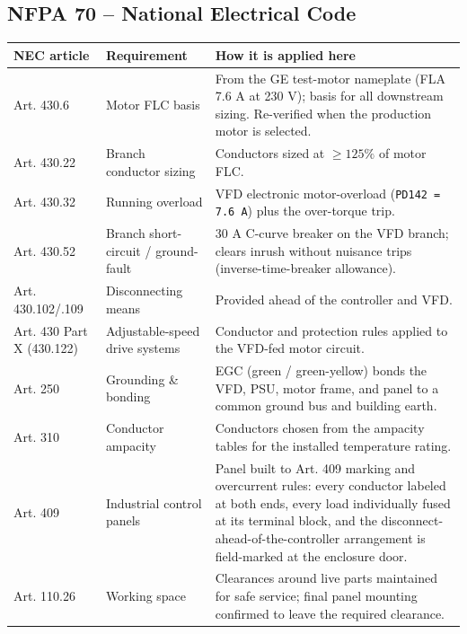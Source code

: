 \documentclass[hidelinks,12pt]{article}
\begin{document}
\subsection{NFPA 70 -- National Electrical Code}
\label{subsec:nec}
\renewcommand{\arraystretch}{1.3}
\noindent\begin{tabularx}{\textwidth}{|p{2.5cm}|p{3.0cm}|X|}
\hline
\rowcolor{PSUgreen!12}\textbf{NEC article} & \textbf{Requirement} & \textbf{How it is applied here} \\
\hline
Art. 430.6 & Motor FLC basis & From the GE test-motor nameplate (FLA 7.6 A at 230 V); basis for all downstream sizing. Re-verified when the production motor is selected. \\ \hline
Art. 430.22 & Branch conductor sizing & Conductors sized at $\geq 125\%$ of motor FLC. \\ \hline
Art. 430.32 & Running overload & VFD electronic motor-overload (\texttt{PD142 = 7.6 A}) plus the over-torque trip. \\ \hline
Art. 430.52 & Branch short-circuit / ground-fault & 30 A C-curve breaker on the VFD branch; clears inrush without nuisance trips (inverse-time-breaker allowance). \\ \hline
Art. 430.102/.109 & Disconnecting means & Provided ahead of the controller and VFD. \\ \hline
Art. 430 Part X (430.122) & Adjustable-speed drive systems & Conductor and protection rules applied to the VFD-fed motor circuit. \\ \hline
Art. 250 & Grounding \& bonding & EGC (green / green-yellow) bonds the VFD, PSU, motor frame, and panel to a common ground bus and building earth. \\ \hline
Art. 310 & Conductor ampacity & Conductors chosen from the ampacity tables for the installed temperature rating. \\ \hline
Art. 409 & Industrial control panels & Panel built to Art. 409 marking and overcurrent rules: every conductor labeled at both ends, every load individually fused at its terminal block, and the disconnect-ahead-of-the-controller arrangement is field-marked at the enclosure door. \\ \hline
Art. 110.26 & Working space & Clearances around live parts maintained for safe service; final panel mounting confirmed to leave the required clearance. \\
\hline
\end{tabularx}
\renewcommand{\arraystretch}{1.0}
\end{document}
